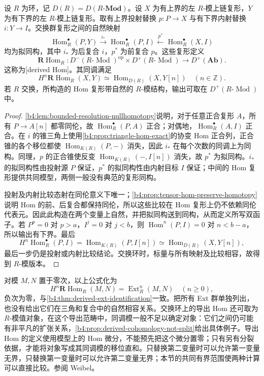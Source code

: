 \begin{theorem}\label{b4:thm:derived-hom}
	设 \(R\) 为环，记 \(D(R)=D(R\text{-}\mathbf{Mod})\)。设 \(X\) 为有上界的左 \(R\)-模上链复形，\(Y\) 为有下界的左 \(R\)-模上链复形。取有上界投射替换 \(p:P\to X\) 与有下界内射替换 \(i:Y\to I\)。交换群复形之间的自然映射
	\[
		\operatorname{Hom}_R^\bullet(P,Y) \xrightarrow{\,i_*\,}\operatorname{Hom}_R^\bullet(P,I) \xleftarrow{\,p^*\,} \operatorname{Hom}_R^\bullet(X,I)
	\]
	均为拟同构，其中 \(i_*\) 为后复合 \(i\)，\(p^*\) 为前复合 \(p\)。这些复形定义
	\[
		\mathbf R\operatorname{Hom}_R: D^-(R\text{-}\operatorname{Mod})^{\mathrm{op}} \times D^+(R\text{-}\operatorname{Mod}) \longrightarrow D^+(\mathbf{Ab}).
	\]
	这称为[derived Hom]。其同调满足
	\[
		H^n\mathbf R\operatorname{Hom}_R(X,Y) \simeq\operatorname{Hom}_{D(R)}(X,Y[n]) \quad(n\in\mathbb Z).
	\]
	若 \(R\) 交换，所构造的 Hom 复形带自然的 \(R\)-模结构，输出可取在 \(D^+(R\text{-}\operatorname{Mod})\) 中。
\end{theorem}
\begin{proof}
	\cref{b4:lem:bounded-resolution-nullhomotopy}说明，对于任意正合复形 \(A\)，所有 \(P\to A[n]\) 都零同伦，故 \(\operatorname{Hom}_R^\bullet(P,A)\) 正合；对偶地，\(\operatorname{Hom}_R^\bullet(A,I)\) 正合。在 \(i\) 的锥三角上使用\cref{b4:prop:triangle-hom-exact}的协变 Hom 正合列，正合锥的各个移位都使 \(\operatorname{Hom}_{K(R)}(P,-)\) 消失，因此 \(i_*\) 在每个次数的同调上为同构。同理，\(p\) 的正合锥使反变 \(\operatorname{Hom}_{K(R)}(-,I[n])\) 消失，故 \(p^*\) 为拟同构。\(i_*\) 的拟同构性由投射源 \(P\) 保证，\(p^*\) 的拟同构性由内射目标 \(I\) 保证；中间的 Hom 复形提供共同模型，两侧一般没有典范的复形同构。

	投射及内射比较态射在同伦意义下唯一；\cref{b4:prop:tensor-hom-preserve-homotopy}说明 Hom 的前、后复合都保持同伦，所以这些比较在 Hom 复形上仍不依赖同伦代表元。因此此构造在两个变量上自然，并把拟同构送到同构，从而定义所写双函子。若 \(P^p=0\) 对 \(p>a\)，\(I^j=0\) 对 \(j<b\)，则 \(\operatorname{Hom}^n(P,I)=0\) 对 \(n<b-a\)，所以输出有下界。最后
	\[
		H^n\operatorname{Hom}_R^\bullet(P,I) =\operatorname{Hom}_{K(R)}(P,I[n]) \simeq\operatorname{Hom}_{D(R)}(X,Y[n]),
	\]
	最后一步仍是投射或内射比较结论。交换环时，标量与所有映射及比较相容，故得到 \(R\)-模版本。
\end{proof}

对模 \(M,N\) 置于零次，以上公式化为
\[
	H^n\mathbf R\operatorname{Hom}_R(M,N)=\operatorname{Ext}_R^n(M,N) \quad(n\ge0),
\]
负次为零，与\cref{b4:thm:derived-ext-identification}一致。把所有 Ext 群单独列出，也没有给出它们在三角和复合中的自然相容关系。交换环上的导出 Hom 还可取为 \(R\)-模值对象，在这个导出范畴中，同调模一般不足以确定对象：它们之间仍可能有非平凡的扩张关系，\cref{b4:prop:derived-cohomology-not-split}给出具体例子。导出 Hom 的定义使用模型上的 Hom 微分，不能预先把这个微分置零；只有另有分裂依据，才能将对象写成其同调模的移位直和。只替换第二变量时可以允许第一变量无界，只替换第一变量时可以允许第二变量无界；本节的共同有界范围使两种计算可以直接比较。参阅 Weibel\cite[Definition 10.7.2, Theorem 10.7.4, Corollary 10.7.5]{Weibel1994HomologicalAlgebra}。

